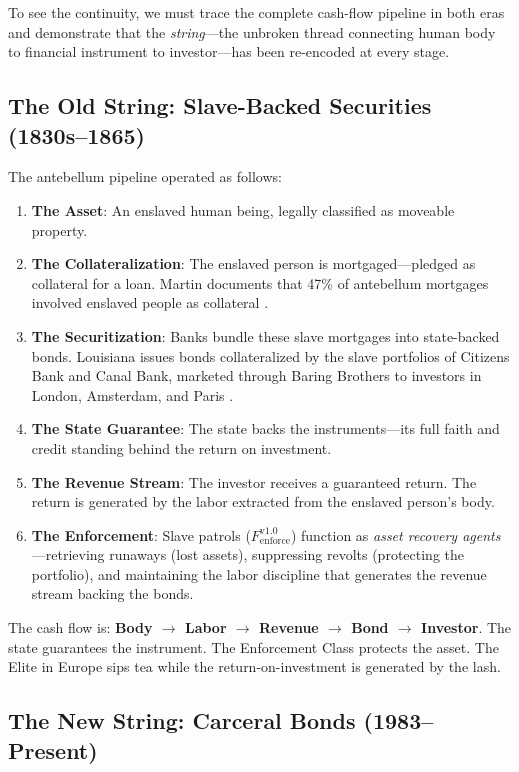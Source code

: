 To see the continuity, we must trace the complete cash-flow pipeline in both eras and demonstrate that the \textit{string}---the unbroken thread connecting human body to financial instrument to investor---has been re-encoded at every stage.

\subsection{The Old String: Slave-Backed Securities (1830s--1865)}

The antebellum pipeline operated as follows:

\begin{enumerate}
    \item \textbf{The Asset}: An enslaved human being, legally classified as moveable property.
    \item \textbf{The Collateralization}: The enslaved person is mortgaged---pledged as collateral for a loan. Martin documents that 47\% of antebellum mortgages involved enslaved people as collateral \cite{martin}.
    \item \textbf{The Securitization}: Banks bundle these slave mortgages into state-backed bonds. Louisiana issues bonds collateralized by the slave portfolios of Citizens Bank and Canal Bank, marketed through Baring Brothers to investors in London, Amsterdam, and Paris \cite{murphy}.
    \item \textbf{The State Guarantee}: The state backs the instruments---its full faith and credit standing behind the return on investment.
    \item \textbf{The Revenue Stream}: The investor receives a guaranteed return. The return is generated by the labor extracted from the enslaved person's body.
    \item \textbf{The Enforcement}: Slave patrols ($F_{\text{enforce}}^{\text{v1.0}}$) function as \textit{asset recovery agents}---retrieving runaways (lost assets), suppressing revolts (protecting the portfolio), and maintaining the labor discipline that generates the revenue stream backing the bonds.
\end{enumerate}

The cash flow is: \textbf{Body $\rightarrow$ Labor $\rightarrow$ Revenue $\rightarrow$ Bond $\rightarrow$ Investor}. The state guarantees the instrument. The Enforcement Class protects the asset. The Elite in Europe sips tea while the return-on-investment is generated by the lash.

\subsection{The New String: Carceral Bonds (1983--Present)}

